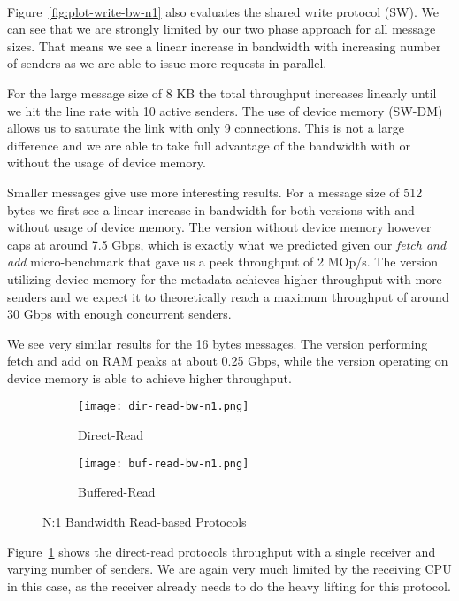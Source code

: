 \paragraph{} Figure~\ref{fig:plot-write-bw-n1} also evaluates the shared write protocol (SW). We can see that we are strongly limited
by our two phase approach for all message sizes. That means we see a linear increase in bandwidth with increasing number of 
senders as we are able to issue more requests in parallel.

For the large message size of 8 KB the total throughput increases linearly until we hit the line rate with 10 
active senders. The use of device memory \mbox{(SW-DM)} allows us to saturate the link with only 9 connections.
This is not a 
large difference and we are able to take full advantage of the bandwidth with or without the usage of device memory.

Smaller messages give use more interesting results. For a message size of 512 bytes we first see a linear 
increase in bandwidth for both versions with and without usage of device memory. The version without device memory however
caps at around 7.5 Gbps, which is exactly what we predicted given our \emph{fetch and add} micro-benchmark that gave us a
peek throughput of 2 MOp/s. The version utilizing device memory for the metadata achieves higher throughput with more
senders and we expect it to theoretically reach a maximum throughput of around 30 Gbps with enough concurrent senders.

We see very similar results for the 16 bytes messages. The version performing fetch and add on RAM peaks at about 0.25 Gbps, 
while the version operating on device memory is able to achieve higher throughput.



\begin{figure}[ht]
  \begin{subfigure}[b]{0.49\textwidth}
  \centering
  \texttt{[image: dir-read-bw-n1.png]}
  \caption{Direct-Read}
  \label{fig:plot-dirread-bw-n1}
  \end{subfigure}
  \begin{subfigure}[b]{0.49\textwidth}
  \centering
  \texttt{[image: buf-read-bw-n1.png]}
  \caption{Buffered-Read}
  \label{fig:plot-bufread-bw-n1}
  \end{subfigure}
  \caption{N:1 Bandwidth Read-based Protocols}
\end{figure}

Figure~\ref{fig:plot-dirread-bw-n1} shows the direct-read protocols throughput with a single receiver and varying number of senders.
We are again very much limited by the receiving CPU in this case, as the receiver already needs to do the heavy lifting for 
this protocol. 

